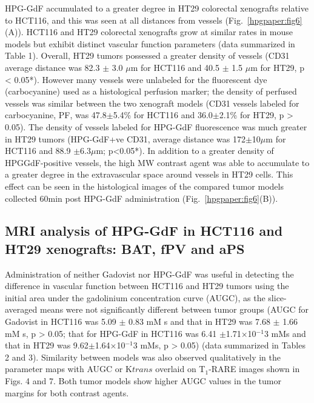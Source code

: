 HPG-GdF accumulated to a greater degree in HT29 colorectal xenografts relative to HCT116, and this was seen at all distances from vessels (Fig.~\ref{hpgpaper:fig6}(A)).
HCT116 and HT29 colorectal xenografts grow at similar rates in mouse models but exhibit distinct vascular function parameters (data summarized in Table 1).
Overall, HT29 tumors possessed a greater density of vessels (CD31 average distance was 82.3 $\pm$ 3.0 $\mu$m for HCT116 and 40.5 $\pm$ 1.5 $\mu$m for HT29, p < 0.05*).
However many vessels were unlabeled for the fluorescent dye (carbocyanine) used as a histological perfusion marker; the density of perfused vessels was similar between the two xenograft models (CD31 vessels labeled for carbocyanine, PF, was 47.8$\pm$5.4\% for HCT116 and 36.0$\pm$2.1\% for HT29, p > 0.05).
The density of vessels labeled for HPG-GdF fluorescence was much greater in HT29 tumors (HPG-GdF+ve CD31, average distance was 172$\pm$10$\mu$m for HCT116 and 88.9 $\pm$6.3$\mu$m; p<0.05*).
In addition to a greater density of HPGGdF-positive vessels, the high MW contrast agent was able to accumulate to a greater degree in the extravascular space around vessels in HT29 cells.
This effect can be seen in the histological images of the compared tumor models collected 60min post HPG-GdF administration (Fig.~\ref{hpgpaper:fig6}(B)).

\subsection{MRI analysis of HPG-GdF in HCT116 and HT29 xenografts: BAT, fPV and aPS}

Administration of neither Gadovist nor HPG-GdF was useful in detecting the difference in vascular function between HCT116 and HT29 tumors using the initial area under the gadolinium concentration curve (AUGC), as the slice-averaged means were not significantly different between tumor groups (AUGC for Gadovist in HCT116 was 5.09 $\pm$ 0.83 mM s and that in HT29 was 7.68 $\pm$ 1.66 mM s, p > 0.05; that for HPG-GdF in HCT116 was 6.41 $\pm$1.71×10$^{-1}$3 mMs and that in HT29 was 9.62$\pm$1.64×10$^{-1}$3 mMs, p > 0.05) (data summarized in Tables 2 and 3).
Similarity between models was also observed qualitatively in the parameter maps with AUGC or K${trans}$ overlaid on T$_1$-RARE images shown in Figs.
4 and 7.
Both tumor models show higher AUGC values in the tumor margins for both contrast agents.

